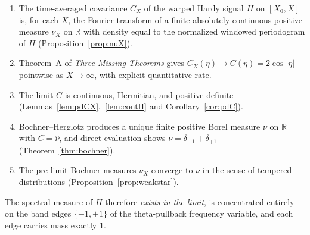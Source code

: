 \documentclass[11pt]{article}
\theoremstyle{definition}
\theoremstyle{remark}
\begin{document}
\begin{enumerate}
\item The time-averaged covariance $C_X$ of the warped Hardy signal $H$ on $[X_0,X]$ is, for each $X$, the Fourier transform of a finite absolutely continuous positive measure $\nu_X$ on $\mathbb{R}$ with density equal to the normalized windowed periodogram of $H$ (Proposition~\ref{prop:nuX}).
\item Theorem~A of \emph{Three Missing Theorems} gives $C_X(\eta)\to C(\eta)=2\cos|\eta|$ pointwise as $X\to\infty$, with explicit quantitative rate.
\item The limit $C$ is continuous, Hermitian, and positive-definite (Lemmas~\ref{lem:pdCX},~\ref{lem:contH} and Corollary~\ref{cor:pdC}).
\item Bochner--Herglotz produces a unique finite positive Borel measure $\nu$ on $\mathbb{R}$ with $C=\widehat\nu$, and direct evaluation shows $\nu=\delta_{-1}+\delta_{+1}$ (Theorem~\ref{thm:bochner}).
\item The pre-limit Bochner measures $\nu_X$ converge to $\nu$ in the sense of tempered distributions (Proposition~\ref{prop:weakstar}).
\end{enumerate}

The spectral measure of $H$ therefore \emph{exists in the limit}, is concentrated entirely on the band edges $\{-1,+1\}$ of the theta-pullback frequency variable, and each edge carries mass exactly $1$.
\end{document}

